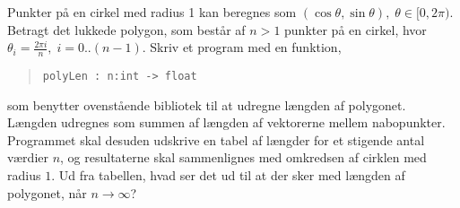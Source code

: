 Punkter på en cirkel med radius 1 kan beregnes som $(\cos \theta, \sin \theta), \;\theta\in [0,2\pi)$. Betragt det lukkede polygon, som består af $n>1$ punkter på en cirkel, hvor $\theta_i = \frac{2\pi i}{n},\; i = 0..(n-1)$.
Skriv et program med en funktion,
  \begin{quote}
    \lstinline{polyLen : n:int -> float}
  \end{quote}
  som benytter ovenstående bibliotek til at udregne længden af polygonet. Længden udregnes som summen af længden af vektorerne mellem nabopunkter. Programmet skal desuden udskrive en tabel af længder for et stigende antal værdier $n$, og resultaterne skal sammenlignes med omkredsen af cirklen med radius $1$. Ud fra tabellen, hvad ser det ud til at der sker med længden af polygonet, når $n\rightarrow\infty$?
